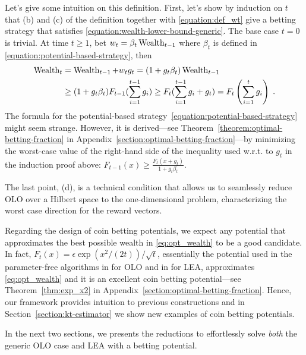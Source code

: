 Let's give some intuition on this definition.  First, let's show by induction
on $t$ that (b) and (c) of the definition together with \eqref{equation:def_wt} give a betting strategy that satisfies
\eqref{equation:wealth-lower-bound-generic}. The base case $t=0$ is trivial. At
time $t \ge 1$, bet $w_t=\beta_t \operatorname{Wealth}_{t-1}$
where $\beta_t$ is defined in \eqref{equation:potential-based-strategy}, then
\begin{align*}
\operatorname{Wealth}_t
&= \operatorname{Wealth}_{t-1} + w_t g_t
= (1+g_t \beta_t) \operatorname{Wealth}_{t-1} \\
&\ge (1 + g_t \beta_t) F_{t-1}(\sum_{i=1}^{t-1} g_i)
\ge F_t(\sum_{i=1}^{t-1} g_i + g_t)
= F_t \left( \sum_{i=1}^t g_i \right) \; .
\end{align*}
%
The formula for the potential-based
strategy~\eqref{equation:potential-based-strategy} might seem strange. However,
it is derived---see Theorem~\ref{theorem:optimal-betting-fraction}
in Appendix~\ref{section:optimal-betting-fraction}---by minimizing the
worst-case value of the right-hand side of the inequality used w.r.t. to $g_t$
in the induction proof above: $F_{t-1}(x) \ge \tfrac{F_{t}(x +
g_t)}{1+g_t\beta_t}$.

The last point, (d), is a technical condition that allows us to seamlessly
reduce OLO over a Hilbert space to the one-dimensional problem, characterizing
the worst case direction for the reward vectors.

Regarding the design of coin betting potentials, we expect any potential that
approximates the best possible wealth in \eqref{eq:opt_wealth} to be a good
candidate.  In fact, $F_t(x)=\epsilon \exp \left(x^2/(2t)\right)/\sqrt{t}$,
essentially the potential used in the parameter-free algorithms in
\cite{McMahan-Orabona-2014, Orabona-2014} for \ac{OLO} and in
\cite{Chaudhuri-Freund-Hsu-2009, Luo-Schapire-2014, Luo-Schapire-2015} for
\ac{LEA}, approximates \eqref{eq:opt_wealth} and it is an excellent coin
betting potential---see Theorem~\ref{thm:exp_x2} in
Appendix~\ref{section:optimal-betting-fraction}. Hence, our framework provides
intuition to previous constructions and in Section~\ref{section:kt-estimator}
we show new examples of coin betting potentials.

In the next two sections, we presents the reductions to effortlessly solve \emph{both} the generic \ac{OLO} case and \ac{LEA} with a betting potential.